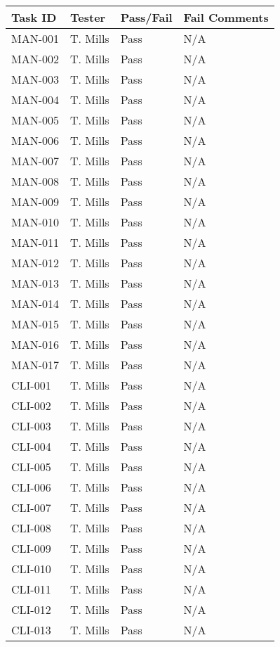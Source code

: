 \documentclass{project}
\begin{document}
\begin{longtable}{| p{1.8cm} | p{2.5cm} | p{2.5cm} | p{8.5cm} |}
\hline
Task ID & Tester & Pass/Fail &  Fail Comments \\
\hline
MAN-001 & T. Mills & Pass & N/A \\
\hline
MAN-002 & T. Mills & Pass & N/A \\
\hline
MAN-003 & T. Mills & Pass & N/A \\
\hline
MAN-004 & T. Mills & Pass & N/A \\
\hline
MAN-005 & T. Mills & Pass & N/A \\
\hline
MAN-006 & T. Mills & Pass & N/A \\
\hline
MAN-007 & T. Mills & Pass & N/A \\
\hline
MAN-008 & T. Mills & Pass & N/A \\
\hline
MAN-009 & T. Mills & Pass & N/A \\
\hline
MAN-010 & T. Mills & Pass & N/A \\
\hline
MAN-011 & T. Mills & Pass & N/A \\
\hline
MAN-012 & T. Mills & Pass & N/A \\
\hline
MAN-013 & T. Mills & Pass & N/A \\
\hline
MAN-014 & T. Mills & Pass & N/A \\
\hline
MAN-015 & T. Mills & Pass & N/A \\
\hline
MAN-016 & T. Mills & Pass & N/A \\
\hline
MAN-017 & T. Mills & Pass & N/A \\
\hline
CLI-001 & T. Mills & Pass & N/A \\
\hline
CLI-002 & T. Mills & Pass & N/A \\
\hline
CLI-003 & T. Mills & Pass & N/A \\
\hline
CLI-004 & T. Mills & Pass & N/A \\
\hline
CLI-005 & T. Mills & Pass & N/A \\
\hline
CLI-006 & T. Mills & Pass & N/A \\
\hline
CLI-007 & T. Mills & Pass & N/A \\
\hline
CLI-008 & T. Mills & Pass & N/A \\
\hline
CLI-009 & T. Mills & Pass & N/A \\
\hline
CLI-010 & T. Mills & Pass & N/A \\
\hline
CLI-011 & T. Mills & Pass & N/A \\
\hline
CLI-012 & T. Mills & Pass & N/A \\
\hline
CLI-013 & T. Mills & Pass & N/A \\

\end{longtable}
\end{document}
